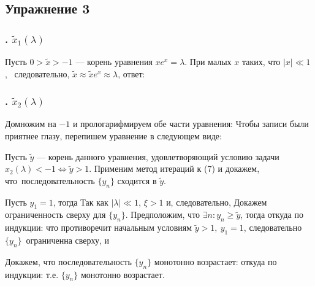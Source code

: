 \def \picdir{pic/}

\subsection*{Упражнение 3}
\subsubsection*{. $\tilde{x}_1(\lambda)$}
Пусть $0 > \tilde{x} > -1$ --- корень уравнения $xe^x = \lambda$. При малых $x$ таких, что $|x| \ll 1$,\
следовательно, $\tilde{x} \approx \tilde{x}e^x \approx \lambda$, ответ:
\salign[*]{\boxed{\tilde{x} \approx \lambda}}
\subsubsection*{. $\tilde{x}_2(\lambda)$}
Домножим на $-1$ и прологарифмируем обе части уравнения:
Чтобы записи были приятнее глазу, перепишем уравнение в следующем виде:
\salign{y = -x, \quad \xi = -\ln{(-\lambda)}, \quad y = \xi + \ln{y}.}

Пусть $\tilde{y}$ --- корень данного уравнения, удовлетворяющий условию задачи\
$x_2(\lambda) < -1 \Leftrightarrow \tilde{y} > 1$. Применим метод итераций к (7) и докажем, что\
последовательность $\{y_n\}$ сходится в $\tilde{y}$.

Пусть $y_1 = 1$, тогда
Так как $|\lambda| \ll 1$, $\xi > 1$ и, следовательно,
Докажем ограниченность сверху для $\{y_n\}$. Предположим, что $\exists n: y_n \geq \tilde{y}$, тогда
откуда по индукции:
что противоречит начальным условиям $\tilde{y} > 1, \ y_1 = 1$, следовательно $\{y_n\}$\
ограниченна сверху, и

Докажем, что последовательность $\{y_n\}$ монотонно возрастает:
откуда по индукции:
т.е. $\{y_n\}$ монотонно возрастает.

